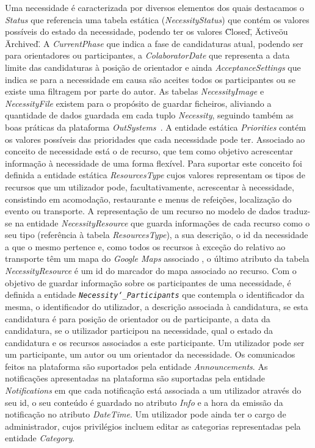  
Uma necessidade é caracterizada por diversos elementos dos quais destacamos o \textit{Status} que referencia uma tabela estática (\textit{NecessityStatus}) que contém os valores possíveis do estado da necessidade, 
podendo ter os valores \"Closed\", \"Active\" ou \"Archived\". A \textit{CurrentPhase} que indica a fase de candidaturas atual, 
podendo ser para orientadores ou participantes, a \textit{ColaboratorDate} que representa a data limite das candidaturas 
à posição de orientador e ainda \textit{AcceptanceSettings} que indica se para a necessidade em causa são aceites todos os participantes ou se existe uma filtragem por parte do autor. 
As tabelas \textit{NecessityImage} e \textit{NecessityFile} existem para o propósito de guardar ficheiros, 
aliviando a quantidade de dados guardada em cada tuplo \textit{Necessity}, 
seguindo também as boas práticas da plataforma \textit{OutSystems~\cite{outsystems}}. 
A entidade estática \textit{Priorities} contém os valores possíveis das prioridades que cada necessidade pode ter.
Associado ao conceito de necessidade está o de recurso, que tem como objetivo acrescentar informação à necessidade de uma forma flexível. 
Para suportar este conceito foi definida a entidade estática \textit{ResourcesType} cujos valores representam os tipos de recursos que um utilizador pode, facultativamente, acrescentar à necessidade, consistindo em acomodação, restaurante e menus de refeições, localização do evento ou transporte. 
A representação de um recurso no modelo de dados traduz-se na entidade \textit{NecessityResource} que guarda informações de cada recurso como o seu tipo (referência à tabela  \textit{ResourcesType}), a sua descrição, o id da necessidade a que o mesmo pertence e, como todos os recursos à exceção do relativo ao transporte têm um mapa do \textit{Google Maps} associado
, o último atributo da tabela \textit{NecessityResource} é um id do marcador do mapa associado ao recurso.
Com o objetivo de guardar informação sobre os participantes de uma necessidade, é definida a entidade \texttt{\textit{Necessity\char`_Participants}} que 
contempla o identificador da mesma, o identificador do utilizador, a descrição associada à candidatura, 
se esta candidatura é para posição de orientador ou de participante, a data da candidatura, se o utilizador participou na necessidade, qual o estado da candidatura e os recursos associados a este participante. 
Um utilizador pode ser um participante, um autor ou um orientador da necessidade. 
Os comunicados feitos na plataforma são suportados pela entidade \textit{Announcements}. As notificações apresentadas na plataforma são suportadas pela entidade \textit{Notifications} em que cada notificação está associada a um utilizador através do seu id, o seu conteúdo é guardado no atributo \textit{Info} e a hora da emissão da notificação no atributo \textit{DateTime}. 
Um utilizador pode ainda ter o cargo de administrador, cujos privilégios incluem editar as categorias representadas pela entidade \textit{Category}.

